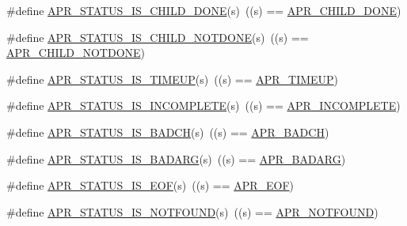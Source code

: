 \begin{DoxyCompactItemize}
\item 
\#define \mbox{\hyperlink{group___a_p_r___s_t_a_t_u_s___i_s_ga1e6539dfa172cef4026105ca33b2b208}{A\+P\+R\+\_\+\+S\+T\+A\+T\+U\+S\+\_\+\+I\+S\+\_\+\+C\+H\+I\+L\+D\+\_\+\+D\+O\+NE}}(s)~((s) == \mbox{\hyperlink{group___a_p_r___error_ga2a78375cab66b8c1a4e06329e0cfcaf4}{A\+P\+R\+\_\+\+C\+H\+I\+L\+D\+\_\+\+D\+O\+NE}})
\item 
\#define \mbox{\hyperlink{group___a_p_r___s_t_a_t_u_s___i_s_ga86190a4a2c04bbbbedc2491bb93ab432}{A\+P\+R\+\_\+\+S\+T\+A\+T\+U\+S\+\_\+\+I\+S\+\_\+\+C\+H\+I\+L\+D\+\_\+\+N\+O\+T\+D\+O\+NE}}(s)~((s) == \mbox{\hyperlink{group___a_p_r___error_ga00bba31c29774cce3e72a31f88610340}{A\+P\+R\+\_\+\+C\+H\+I\+L\+D\+\_\+\+N\+O\+T\+D\+O\+NE}})
\item 
\#define \mbox{\hyperlink{group___a_p_r___s_t_a_t_u_s___i_s_ga864b207719c86ac4deeba696943262d0}{A\+P\+R\+\_\+\+S\+T\+A\+T\+U\+S\+\_\+\+I\+S\+\_\+\+T\+I\+M\+E\+UP}}(s)~((s) == \mbox{\hyperlink{group___a_p_r___error_ga9ac087c25ffb0d3bb4d75bee36709853}{A\+P\+R\+\_\+\+T\+I\+M\+E\+UP}})
\item 
\#define \mbox{\hyperlink{group___a_p_r___s_t_a_t_u_s___i_s_ga8385878e572abf0b2f78a0ab7d1bc8a5}{A\+P\+R\+\_\+\+S\+T\+A\+T\+U\+S\+\_\+\+I\+S\+\_\+\+I\+N\+C\+O\+M\+P\+L\+E\+TE}}(s)~((s) == \mbox{\hyperlink{group___a_p_r___error_ga64dff43b83bcefd3f3c751be6b864ca1}{A\+P\+R\+\_\+\+I\+N\+C\+O\+M\+P\+L\+E\+TE}})
\item 
\#define \mbox{\hyperlink{group___a_p_r___s_t_a_t_u_s___i_s_ga20308232897ebff445dc10d0b69a0be2}{A\+P\+R\+\_\+\+S\+T\+A\+T\+U\+S\+\_\+\+I\+S\+\_\+\+B\+A\+D\+CH}}(s)~((s) == \mbox{\hyperlink{group___a_p_r___error_ga6f3ca71069880d9fe5678687a257d616}{A\+P\+R\+\_\+\+B\+A\+D\+CH}})
\item 
\#define \mbox{\hyperlink{group___a_p_r___s_t_a_t_u_s___i_s_ga88b31c127ad48d12353d175926913cb3}{A\+P\+R\+\_\+\+S\+T\+A\+T\+U\+S\+\_\+\+I\+S\+\_\+\+B\+A\+D\+A\+RG}}(s)~((s) == \mbox{\hyperlink{group___a_p_r___error_ga771bf48ab38d93355be8530f6efe4ae9}{A\+P\+R\+\_\+\+B\+A\+D\+A\+RG}})
\item 
\#define \mbox{\hyperlink{group___a_p_r___s_t_a_t_u_s___i_s_gaf4232cd96b47b76aec9607b1a78e694f}{A\+P\+R\+\_\+\+S\+T\+A\+T\+U\+S\+\_\+\+I\+S\+\_\+\+E\+OF}}(s)~((s) == \mbox{\hyperlink{group___a_p_r___error_ga35d9dca2514c522a2840aca0f3e2ebd3}{A\+P\+R\+\_\+\+E\+OF}})
\item 
\#define \mbox{\hyperlink{group___a_p_r___s_t_a_t_u_s___i_s_ga51bc0a0e249f5d09dba3ed9dc02c49e5}{A\+P\+R\+\_\+\+S\+T\+A\+T\+U\+S\+\_\+\+I\+S\+\_\+\+N\+O\+T\+F\+O\+U\+ND}}(s)~((s) == \mbox{\hyperlink{group___a_p_r___error_ga9bd83273ff02f31f71fb4dc6f29df4a9}{A\+P\+R\+\_\+\+N\+O\+T\+F\+O\+U\+ND}})

\end{DoxyCompactItemize}
